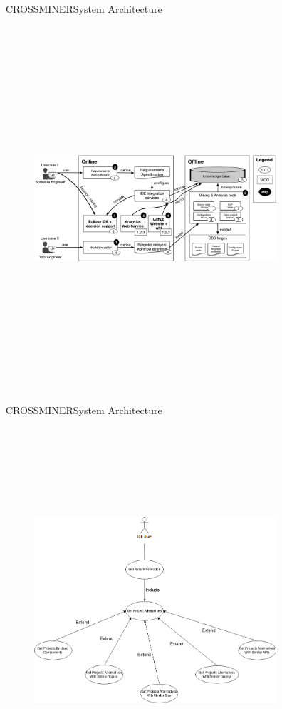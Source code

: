 \documentclass{beamer}
\begin{document}
\begin{frame}{CROSSMINER}{System Architecture}
	\begin{figure}[!h]
	\includegraphics[width=9cm,height=13.5cm,keepaspectratio]{images/crossminer.png}
	\centering
	\label{fig:Crossminer}
	\end{figure}
\end{frame}

\begin{frame}{CROSSMINER}{System Architecture}
	\begin{figure}[!h]
	\includegraphics[width=9cm,height=13.5cm,keepaspectratio]{images/UseCaseDiagram.png}
	\centering
	\label{fig:UseCaseDiagram}
	\end{figure}
\end{frame}
\end{document}
